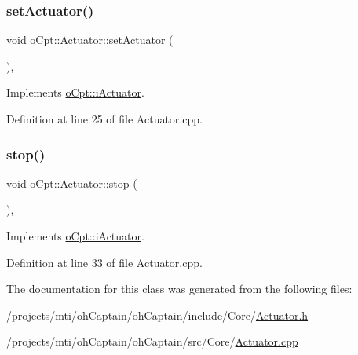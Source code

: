 \subsubsection{\texorpdfstring{set\+Actuator()}{setActuator()}}
{\footnotesize\ttfamily void o\+Cpt\+::\+Actuator\+::set\+Actuator (\begin{DoxyParamCaption}{ }\end{DoxyParamCaption})\hspace{0.3cm}{\ttfamily [override]}, {\ttfamily [virtual]}}



Implements \hyperlink{classo_cpt_1_1i_actuator_a1654bf3167a1dd7c34f770180cd8aaa1}{o\+Cpt\+::i\+Actuator}.



Definition at line 25 of file Actuator.\+cpp.

\hypertarget{classo_cpt_1_1_actuator_aa41132ff134e8b067353459dedbb0f37}{}\label{classo_cpt_1_1_actuator_aa41132ff134e8b067353459dedbb0f37} 
\subsubsection{\texorpdfstring{stop()}{stop()}}
{\footnotesize\ttfamily void o\+Cpt\+::\+Actuator\+::stop (\begin{DoxyParamCaption}{ }\end{DoxyParamCaption})\hspace{0.3cm}{\ttfamily [override]}, {\ttfamily [virtual]}}



Implements \hyperlink{classo_cpt_1_1i_actuator_ae3f9fbb61d920bee1bd297fb5a89625e}{o\+Cpt\+::i\+Actuator}.



Definition at line 33 of file Actuator.\+cpp.



The documentation for this class was generated from the following files\+:\begin{DoxyCompactItemize}
\item 
/projects/mti/oh\+Captain/oh\+Captain/include/\+Core/\hyperlink{_actuator_8h}{Actuator.\+h}\item 
/projects/mti/oh\+Captain/oh\+Captain/src/\+Core/\hyperlink{_actuator_8cpp}{Actuator.\+cpp}\end{DoxyCompactItemize}
